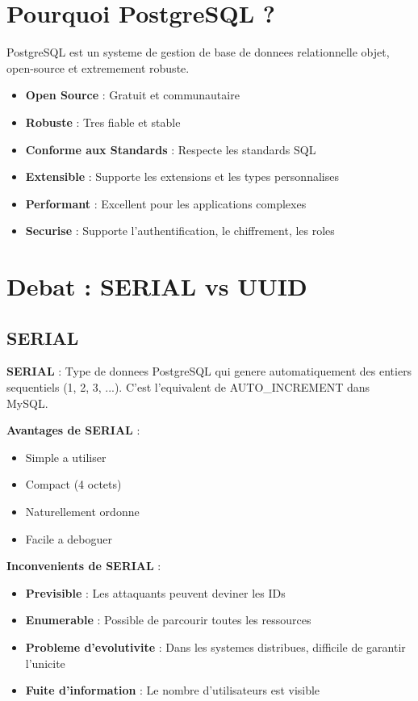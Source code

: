 \documentclass[a4paper,12pt]{book}
\begin{document}
\section{Pourquoi PostgreSQL ?}

PostgreSQL est un systeme de gestion de base de donnees relationnelle objet, open-source et extremement robuste.

\begin{itemize}
    \item \textbf{Open Source} : Gratuit et communautaire
    \item \textbf{Robuste} : Tres fiable et stable
    \item \textbf{Conforme aux Standards} : Respecte les standards SQL
    \item \textbf{Extensible} : Supporte les extensions et les types personnalises
    \item \textbf{Performant} : Excellent pour les applications complexes
    \item \textbf{Securise} : Supporte l'authentification, le chiffrement, les roles
\end{itemize}

\section{Debat : SERIAL vs UUID}

\subsection{SERIAL}

\begin{definitionbox}
    \textbf{SERIAL} : Type de donnees PostgreSQL qui genere automatiquement des entiers sequentiels (1, 2, 3, ...). C'est l'equivalent de AUTO\_INCREMENT dans MySQL.
\end{definitionbox}

\textbf{Avantages de SERIAL} :
\begin{itemize}
    \item Simple a utiliser
    \item Compact (4 octets)
    \item Naturellement ordonne
    \item Facile a deboguer
\end{itemize}

\textbf{Inconvenients de SERIAL} :
\begin{itemize}
    \item \textbf{Previsible} : Les attaquants peuvent deviner les IDs
    \item \textbf{Enumerable} : Possible de parcourir toutes les ressources
    \item \textbf{Probleme d'evolutivite} : Dans les systemes distribues, difficile de garantir l'unicite
    \item \textbf{Fuite d'information} : Le nombre d'utilisateurs est visible
\end{itemize}
\end{document}
